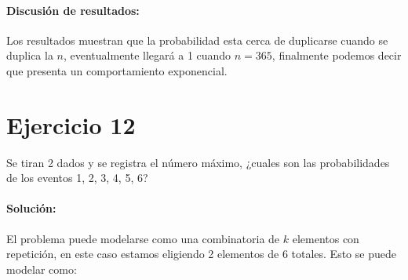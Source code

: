 \documentclass[12pt]{article}
\begin{document}
\paragraph{Discusión de resultados:} Los resultados muestran que la probabilidad esta cerca de duplicarse cuando se duplica la $n$, eventualmente llegará a 1 cuando $n=365$, finalmente podemos decir que presenta un comportamiento exponencial.
\section{Ejercicio 12}
Se tiran 2 dados y se registra el número máximo, ¿cuales son las probabilidades de los eventos
1, 2, 3, 4, 5, 6?
\paragraph{Solución: } 
El problema puede modelarse como una combinatoria de $k$ elementos con repetición, en este caso estamos eligiendo 2 elementos de 6 totales. Esto se puede modelar como:
\end{document}
